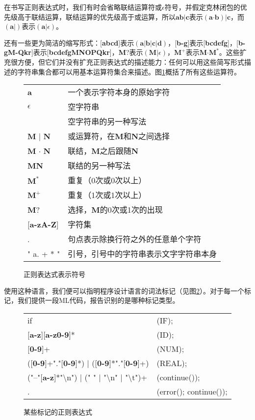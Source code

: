 \documentclass[cn,11pt,chinese]{elegantbook}
\begin{document}
在书写正则表达式时，我们有时会省略联结运算符或$\epsilon$符号，并假定克林闭包的优先级高于联结运算，联结运算的优先级高于或运算，所以$\textbf{ab}|\textbf{c}$表示$(\textbf{a}\boldsymbol{\cdot}\textbf{b})|\textbf{c}$，而$(\textbf{a}|)$表示$(\textbf{a}|\epsilon)$。

还有一些更为简洁的缩写形式：[\textbf{abcd}]表示$(\textbf{a}|\textbf{b}|\textbf{c}|\textbf{d})$，[\textbf{b-g}]表示[\textbf{bcdefg}]，[\textbf{b-gM-Qkr}]表示[\textbf{bcdefgMNOPQkr}]，\textbf{M}?表示$(\textbf{M}|\epsilon)$，$\textbf{M}^+$表示$\textbf{M}\boldsymbol{\cdot}\textbf{M}^*$。这些扩充很方便，但它们并没有扩充正则表达式的描述能力：任何可以用这些简写形式描述的字符串集合都可以用基本运算符集合来描述。图\ref{fig:2-1}概括了所有这些运算符。

\begin{figure}[htbp]
  \centering
  \begin{tabular}{ll}
    \toprule
    \textbf{a} & 一个表示字符本身的原始字符 \\
    $\epsilon$ & 空字符串 \\
               & 空字符串的另一种写法 \\
    \textbf{M} | \textbf{N} & 或运算符，在\textbf{M}和\textbf{N}之间选择 \\
    \textbf{M} $\boldsymbol{\cdot}$ \textbf{N} & 联结，\textbf{M}之后跟随\textbf{N} \\
    \textbf{MN} & 联结的另一种写法 \\
    $\textbf{M}^*$ & 重复（0次或0次以上） \\
    $\textbf{M}^+$ & 重复（1次或1次以上） \\
    \textbf{M}? & 选择，\textbf{M}的0次或1次的出现 \\
    {[}\textbf{a-zA-Z}{]} & 字符集 \\
    . & 句点表示除换行符之外的任意单个字符 \\
    " a. + * " & 引号，引号中的字符串表示文字字符串本身 \\
    \bottomrule
  \end{tabular}
  \caption{正则表达式表示符号}
  \label{fig:2-1}
\end{figure}

使用这种语言，我们便可以指明程序设计语言的词法标记（见图\ref{fig:2-2}）。对于每一个标记，我们提供一段ML代码，报告识别的是哪种标记类型。

\begin{figure}[htbp]
  \centering
  \begin{tabular}{ll}
    if & (IF); \\
    {[}\textbf{a-z}{]}{[}\textbf{a-z0-9}{]}* & (ID); \\
    {[}\textbf{0-9}{]}+ & (NUM); \\
    ({[}\textbf{0-9}{]}+"."{[}\textbf{0-9}{]}*) | ({[}\textbf{0-9}{]}*"."{[}\textbf{0-9}{]}+) & (REAL); \\
    ("--"{[}\textbf{a-z}{]}*"\textbackslash n") | (" " | "\textbackslash n" | "\textbackslash t")+ & (continue()); \\
    . & (error(); continue()); \\
  \end{tabular}
  \caption{某些标记的正则表达式}
  \label{fig:2-2}
\end{figure}
\end{document}
